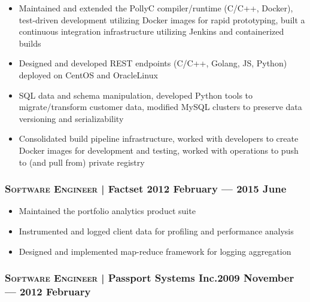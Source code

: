 \documentclass[letterpaper,10pt]{article}
\begin{document}
\begin{itemize}

\item
  Maintained and extended the PollyC compiler/runtime (C/C++, Docker),
  test-driven development utilizing Docker images for rapid prototyping, built
  a continuous integration infrastructure utilizing Jenkins and containerized
  builds
\item
  Designed and developed REST endpoints (C/C++, Golang, JS, Python) deployed on
  CentOS and OracleLinux
\item
  SQL data and schema manipulation, developed Python tools to migrate/transform
  customer data, modified MySQL clusters to preserve data versioning and
  serializability
\item
  Consolidated build pipeline infrastructure, worked with developers to create
  Docker images for development and testing, worked with operations to push to
  (and pull from) private registry

\end{itemize}



\subsubsection*{\textsc{Software Engineer} | Factset \hfill 2012 February --- 2015 June}

\begin{itemize}

\item
  Maintained the portfolio analytics product suite
\item
  Instrumented and logged client data for profiling and performance analysis
\item
  Designed and implemented map-reduce framework for logging aggregation

\end{itemize}


\subsubsection*{\textsc{Software Engineer} | Passport Systems Inc.\hfill 2009 November --- 2012 February}
\end{document}
